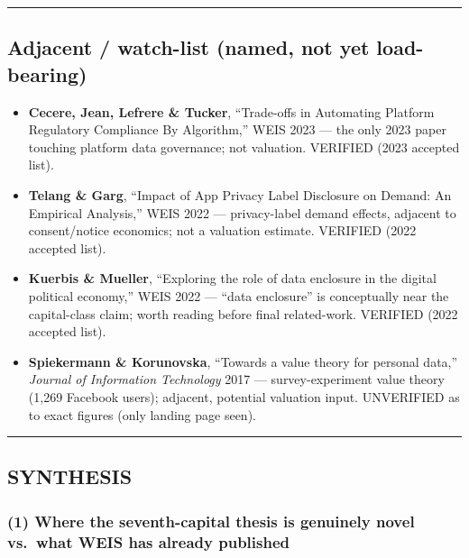 \documentclass[
  11pt,
]{article}
\providecommand{\tightlist}{%
  \setlength{\itemsep}{0pt}\setlength{\parskip}{0pt}}
\begin{document}
\begin{center}\rule{0.5\linewidth}{0.5pt}\end{center}

\subsection{Adjacent / watch-list (named, not yet
load-bearing)}\label{adjacent-watch-list-named-not-yet-load-bearing}

\begin{itemize}
\tightlist
\item
  \textbf{Cecere, Jean, Lefrere \& Tucker}, ``Trade-offs in Automating
  Platform Regulatory Compliance By Algorithm,'' WEIS 2023 --- the only
  2023 paper touching platform data governance; not valuation. VERIFIED
  (2023 accepted list).
\item
  \textbf{Telang \& Garg}, ``Impact of App Privacy Label Disclosure on
  Demand: An Empirical Analysis,'' WEIS 2022 --- privacy-label demand
  effects, adjacent to consent/notice economics; not a valuation
  estimate. VERIFIED (2022 accepted list).
\item
  \textbf{Kuerbis \& Mueller}, ``Exploring the role of data enclosure in
  the digital political economy,'' WEIS 2022 --- ``data enclosure'' is
  conceptually near the capital-class claim; worth reading before final
  related-work. VERIFIED (2022 accepted list).
\item
  \textbf{Spiekermann \& Korunovska}, ``Towards a value theory for
  personal data,'' \emph{Journal of Information Technology} 2017 ---
  survey-experiment value theory (1,269 Facebook users); adjacent,
  potential valuation input. UNVERIFIED as to exact figures (only
  landing page seen).
\end{itemize}

\begin{center}\rule{0.5\linewidth}{0.5pt}\end{center}

\subsection{SYNTHESIS}\label{synthesis}

\subsubsection{(1) Where the seventh-capital thesis is genuinely novel
vs.~what WEIS has already
published}\label{where-the-seventh-capital-thesis-is-genuinely-novel-vs.-what-weis-has-already-published}
\end{document}
